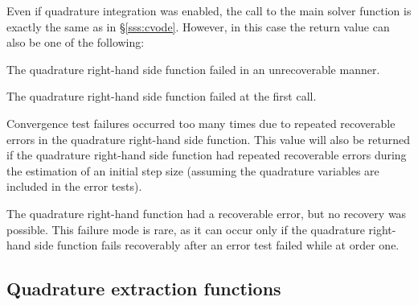 Even if quadrature integration was enabled, the call to the main solver 
function  is exactly the same as in \S\ref{sss:cvode}. However, in this
case the return value  can also be one of the following:
\begin{args}
\item[\Id{CV\_QRHSFUNC\_FAIL}]
  The quadrature right-hand side function failed in an unrecoverable manner.
\item[\Id{CV\_FIRST\_QRHSFUNC\_FAIL}]
  The quadrature right-hand side function failed at the first call.
\item[\Id{CV\_REPTD\_QRHSFUNC\_ERR}]
  Convergence test failures occurred too many times due to repeated recoverable errors in
  the quadrature right-hand side function. This value will also
  be returned if the quadrature right-hand side function had repeated recoverable errors
  during the estimation of an initial step size (assuming the quadrature
  variables are included in the error tests).
\item[\Id{CV\_UNREC\_RHSFUNC\_ERR}]
  The quadrature right-hand function had a recoverable error, but no recovery was possible.
  This failure mode is rare, as it can occur only if the quadrature right-hand side function
  fails recoverably after an error test failed while at order one.
\end{args}


\subsection{Quadrature extraction functions}\label{ss:quad_get}

